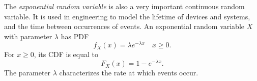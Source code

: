 The \emph{exponential random variable} is also a very important continuous random variable.
It is used in engineering to model the lifetime of devices and systems, and the time between occurrences of events.
An exponential random variable $X$ with parameter $\lambda$ has PDF
\begin{equation*}
f_X (x) = \lambda e^{- \lambda x} \quad x \geq 0.
\end{equation*}
For $x \geq 0$, its CDF is equal to
\begin{equation*}
F_X (x) = 1 - e^{- \lambda x} .
\end{equation*}
The parameter $\lambda$ characterizes the rate at  which events occur.

\begin{example}
\end{example}

